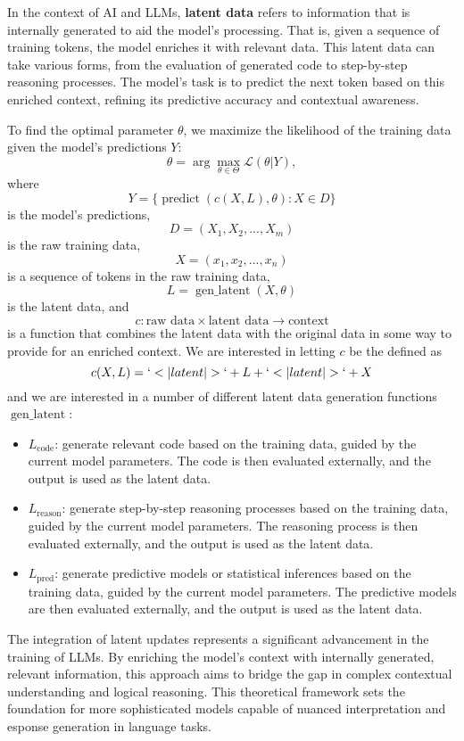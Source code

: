 \documentclass[
]{article}
\providecommand{\tightlist}{%
  \setlength{\itemsep}{0pt}\setlength{\parskip}{0pt}}
\begin{document}
In the context of AI and LLMs, \textbf{latent data} refers to
information that is internally generated to aid the model's processing.
That is, given a sequence of training tokens, the model enriches it with
relevant data. This latent data can take various forms, from the
evaluation of generated code to step-by-step reasoning processes. The
model's task is to predict the next token based on this enriched
context, refining its predictive accuracy and contextual awareness.

To find the optimal parameter \(\theta\), we maximize the likelihood of
the training data given the model's predictions \(Y\): \[
\theta = \arg\max_{\theta \in \Theta} \mathcal{L}(\theta|Y),
\] where \[
Y = \{ \operatorname{predict}(c(X, L), \theta) : X \in D\}
\] is the model's predictions, \[
D = (X_1, X_2, ..., X_m)
\] is the raw training data, \[
X = (x_1, x_2, ..., x_n)
\] is a sequence of tokens in the raw training data, \[
L = \operatorname{gen\_latent}(X, \theta)
\] is the latent data, and \[
c : \text{raw data} \times \text{latent data} \rightarrow \text{context}
\] is a function that combines the latent data with the original data in
some way to provide for an enriched context. We are interested in
letting \(c\) be the defined as \[
c(X, L) = `<|latent|>` + L + `<|latent|>` + X
\] and we are interested in a number of different latent data generation
functions \(\operatorname{gen\_latent}\):

\begin{itemize}
\tightlist
\item
  \(L_{\text{code}}\): generate relevant code based on the training
  data, guided by the current model parameters. The code is then
  evaluated externally, and the output is used as the latent data.
\item
  \(L_{\text{reason}}\): generate step-by-step reasoning processes based
  on the training data, guided by the current model parameters. The
  reasoning process is then evaluated externally, and the output is used
  as the latent data.
\item
  \(L_{\text{pred}}\): generate predictive models or statistical
  inferences based on the training data, guided by the current model
  parameters. The predictive models are then evaluated externally, and
  the output is used as the latent data.
\end{itemize}

The integration of latent updates represents a significant advancement
in the training of LLMs. By enriching the model's context with
internally generated, relevant information, this approach aims to bridge
the gap in complex contextual understanding and logical reasoning. This
theoretical framework sets the foundation for more sophisticated models
capable of nuanced interpretation and esponse generation in language
tasks.
\end{document}
